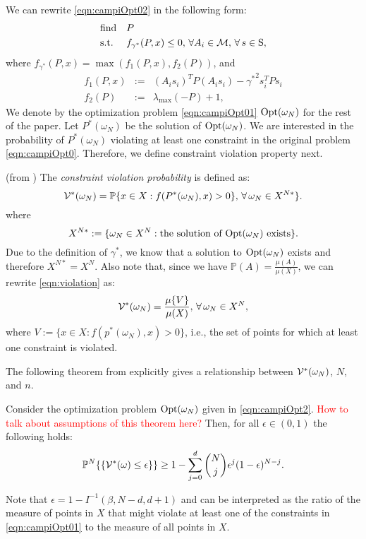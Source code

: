 We can rewrite \eqref{eqn:campiOpt02} in the following form:
\begin{equation}
\label{eqn:campiOpt2}
\begin{aligned}
& \text{find} & & P \\
& \text{s.t.} 
& & f_{\gamma^*}(P, x) \leq 0,\,\forall A_i \in \mathcal{M}, \,\forall\, s \in \text{S}, \end{aligned}
\end{equation}
where $f_{\gamma^*}(P,x) = \max(f_1(P, x), f_2(P))$, and 
\begin{eqnarray*}
f_1(P, x) &:=& (A_is_i)^TP(A_is_i) - {\gamma^*}^2 s_i^TPs_i \\
f_2(P) &:=& \lambda_{\max}(-P) +1,
\end{eqnarray*}
We denote by the optimization problem \eqref{eqn:campiOpt01} $\text{Opt}(\omega_N)$ for the rest of the paper. Let $P^*(\omega_N)$ be the solution of $\text{Opt}(\omega_N)$. We are interested in the probability of $P^*(\omega_N)$ violating at least one constraint in the original problem \eqref{eqn:campiOpt0}. Therefore, we define constraint violation property next.

\begin{definition}(from \cite{campi}) The \emph{constraint violation probability} is defined as:
\begin{equation}\label{eqn:violation}
\mathcal{V}^*(\omega_N)=
      \mathbb{P}\{x \in X: f(P^*(\omega_N), x) > 0\},\, \forall\, \omega_N \in X^{N*}\}.
\end{equation}
where $$X^{N*}:=\{\omega_N \in X^N: \text{the solution of $\text{Opt}(\omega_N)$ exists}\}.$$ 
Due to the definition of $\gamma^*$, we know that a solution to $\text{Opt}(\omega_N)$ exists and therefore $X^{N*} = X^N$. Also note that, since we have $\mathbb{P}(A) = \frac{\mu(A)}{\mu(X)}$, we can rewrite \eqref{eqn:violation} as:
\begin{equation*}
\mathcal{V}^*(\omega_N)=
      \frac{\mu\{V\}}{\mu(X)},\, \forall\, \omega_N \in X^N,
\end{equation*}
where $V:=\{x \in X: f(p^*(\omega_N),x) > 0\}$, i.e., the set of points for which at least one constraint is violated.
\end{definition}

The following theorem from \cite{campi} explicitly gives a relationship between $\mathcal{V}^*(\omega_N)$, $N$, and $n$.
\begin{theorem}\label{thm:campi}Consider the optimization problem $\text{Opt}(\omega_N)$ given in \eqref{eqn:campiOpt2}. \textcolor{red}{How to talk about assumptions of this theorem here?} Then, for all $\epsilon \in (0,1)$ the following holds:
\begin{equation*}\mathbb{P}^N\{\{\mathcal{V}^*(\omega) \leq \epsilon\} \} \geq 1- \sum_{j=0}^{d} \binom{N}{j}\epsilon^j (1-\epsilon)^{N-j}.\end{equation*}
\end{theorem}
Note that $\epsilon=1-I^{-1}(\beta, N-d, d+1)$ and can be interpreted as the ratio of the measure of points in $X$ that might violate at least one of the constraints in \eqref{eqn:campiOpt01} to the measure of all points in $X$.

